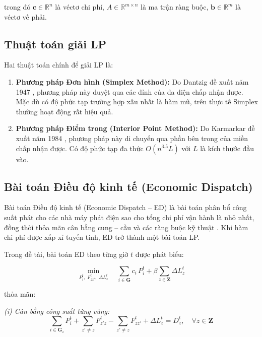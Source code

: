 \noindent trong đó $\mathbf{c} \in \mathbb{R}^n$ là véctơ chi phí, $A \in \mathbb{R}^{m \times n}$ là ma trận ràng buộc, $\mathbf{b} \in \mathbb{R}^m$ là véctơ vế phải.

\subsection{Thuật toán giải LP}

Hai thuật toán chính để giải LP là:

\begin{enumerate}
    \item \textbf{Phương pháp Đơn hình (Simplex Method):} Do Dantzig đề xuất năm 1947 \cite{dantzig1951simplex}, phương pháp này duyệt qua các đỉnh của đa diện chấp nhận được. Mặc dù có độ phức tạp trường hợp xấu nhất là hàm mũ, trên thực tế Simplex thường hoạt động rất hiệu quả.
    
    \item \textbf{Phương pháp Điểm trong (Interior Point Method):} Do Karmarkar đề xuất năm 1984 \cite{karmarkar1984interior}, phương pháp này di chuyển qua phần bên trong của miền chấp nhận được. Có độ phức tạp đa thức $O(n^{3.5}L)$ với $L$ là kích thước đầu vào.
\end{enumerate}

\subsection{Bài toán Điều độ kinh tế (Economic Dispatch)}

Bài toán Điều độ kinh tế (Economic Dispatch -- ED) là bài toán phân bổ công suất phát cho các nhà máy phát điện sao cho tổng chi phí vận hành là nhỏ nhất, đồng thời thỏa mãn cân bằng cung -- cầu và các ràng buộc kỹ thuật \cite{wood2013powersystems}. Khi hàm chi phí được xấp xỉ tuyến tính, ED trở thành một bài toán LP.

Trong đề tài, bài toán ED theo từng giờ $t$ được phát biểu:

\begin{equation}
    \min_{P_i^t,\; F_{zz'}^t,\; \Delta L_z^t} \quad
    \sum_{i \in \mathbf{G}} c_i \, P_i^t + \beta \sum_{z \in \mathbf{Z}} \Delta L_z^t
    \label{eq:ed_objective}
\end{equation}

\noindent thỏa mãn:

\noindent \textit{(i) Cân bằng công suất từng vùng:}
\begin{equation}
    \sum_{i \in \mathbf{G}_z} P_i^t + \sum_{z' \ne z} F_{z'z}^t - \sum_{z' \ne z} F_{zz'}^t + \Delta L_z^t = D_z^t,
    \quad \forall z \in \mathbf{Z}
    \label{eq:power_balance}
\end{equation}

